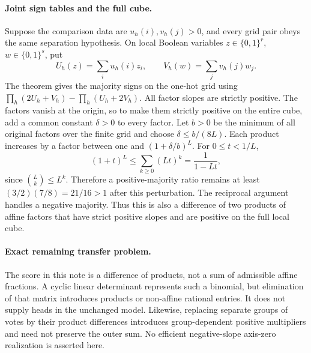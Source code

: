 \documentclass[11pt]{article}
\begin{document}
\paragraph{Joint sign tables and the full cube.}
Suppose the comparison data are $u_h(i),v_h(j)>0$, and every grid
pair obeys the same separation hypothesis. On local Boolean variables
$z\in\{0,1\}^r$, $w\in\{0,1\}^s$, put
\[
 U_h(z)=\sum_i u_h(i)z_i,\qquad V_h(w)=\sum_jv_h(j)w_j.
\]
The theorem gives the majority signs on the one-hot grid using
$\prod_h(2U_h+V_h)-\prod_h(U_h+2V_h)$.
All factor slopes are strictly positive. The factors vanish at the
origin, so to make them strictly positive on the entire cube, add a
common constant $\delta>0$ to every factor. Let $b>0$ be the
minimum of all original factors over the finite grid and choose
$\delta\leq b/(8L)$. Each product increases by a factor between
one and $(1+\delta/b)^L$. For $0\leq t<1/L$,
\[
 (1+t)^L\leq\sum_{k\geq0}(Lt)^k=\frac1{1-Lt},
\]
since $\binom Lk\leq L^k$. Therefore a positive-majority ratio
remains at least $(3/2)(7/8)=21/16>1$ after this perturbation.
The reciprocal argument handles a negative majority. Thus this is
also a difference of two products of affine factors that have strict
positive slopes and are positive on the full local cube.

\paragraph{Exact remaining transfer problem.}
The score in this note is a difference of products, not a sum of
admissible affine fractions. A cyclic linear determinant represents
such a binomial, but elimination of that matrix introduces products
or non-affine rational entries. It does not supply heads in the
unchanged model. Likewise, replacing separate groups of votes by
their product differences introduces group-dependent positive
multipliers and need not preserve the outer sum. No efficient
negative-slope axis-zero realization is asserted here.
\end{document}
